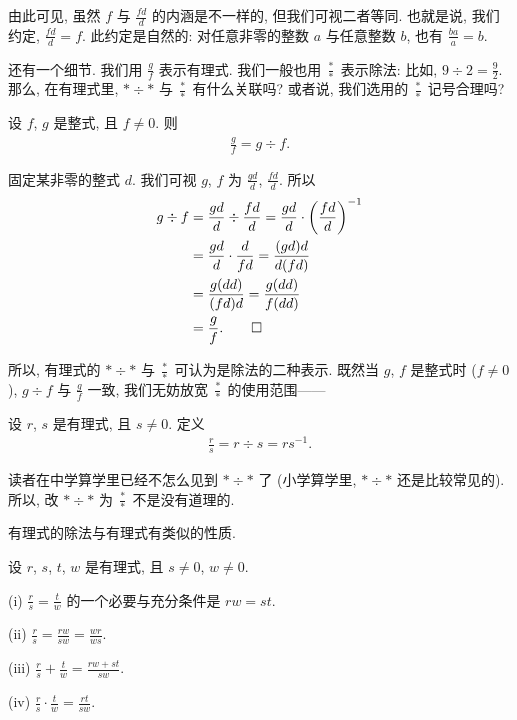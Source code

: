由此可见, 虽然 $f$ 与 $\frac{fd}{d}$ 的内涵是不一样的, 但我们可视二者等同. 也就是说, 我们约定, $\frac{fd}{d} = f$. 此约定是自然的: 对任意非零的整数 $a$ 与任意整数 $b$, 也有 $\frac{ba}{a} = b$.

还有一个细节. 我们用 $\frac{g}{f}$ 表示有理式. 我们一般也用 $\frac{\ast}{\ast}$ 表示除法: 比如, $9 \div 2 = \frac{9}{2}$. 那么, 在有理式里, $\ast \div \ast$ 与 $\frac{\ast}{\ast}$ 有什么关联吗? 或者说, 我们选用的 $\frac{\ast}{\ast}$ 记号合理吗?

\begin{proposition}
    设 $f$, $g$ 是整式, 且 $f \neq 0$. 则
    \begin{align*}
        \frac{g}{f} = g \div f.
    \end{align*}
\end{proposition}

\begin{pf}
    固定某非零的整式 $d$. 我们可视 $g$, $f$ 为 $\frac{gd}{d}$, $\frac{fd}{d}$. 所以
    \begin{align*}
        g \div f
        = {} & \frac{gd}{d} \div \frac{fd}{d}
        = \frac{gd}{d} \cdot \left( \frac{fd}{d} \right)^{-1} \\
        = {} & \frac{gd}{d} \cdot \frac{d}{fd}
        = \frac{(gd)d}{d(fd)}                                 \\
        = {} & \frac{g(dd)}{(fd)d}
        = \frac{g(dd)}{f(dd)}                                 \\
        = {} & \frac{g}{f}. \qedhere
    \end{align*}
\end{pf}

所以, 有理式的 $\ast \div \ast$ 与 $\frac{\ast}{\ast}$ 可认为是除法的二种表示. 既然当 $g$, $f$ 是整式时 ($f \neq 0$), $g \div f$ 与 $\frac{g}{f}$ 一致, 我们无妨放宽 $\frac{\ast}{\ast}$ 的使用范围——
\begin{definition}
    设 $r$, $s$ 是有理式, 且 $s \neq 0$. 定义
    \begin{align*}
        \frac{r}{s} = r \div s = rs^{-1}.
    \end{align*}
\end{definition}

读者在中学算学里已经不怎么见到 $\ast \div \ast$ 了 (小学算学里, $\ast \div \ast$ 还是比较常见的). 所以, 改 $\ast \div \ast$ 为 $\frac{\ast}{\ast}$ 不是没有道理的.

有理式的除法与有理式有类似的性质.

\begin{proposition}
    设 $r$, $s$, $t$, $w$ 是有理式, 且 $s \neq 0$, $w \neq 0$.

    (i) $\frac{r}{s} = \frac{t}{w}$ 的一个必要与充分条件是 $rw = st$.

    (ii) $\frac{r}{s} = \frac{rw}{sw} = \frac{wr}{ws}$.

    (iii) $\frac{r}{s} + \frac{t}{w} = \frac{rw + st}{sw}$.

    (iv) $\frac{r}{s} \cdot \frac{t}{w} = \frac{rt}{sw}$.
\end{proposition}


